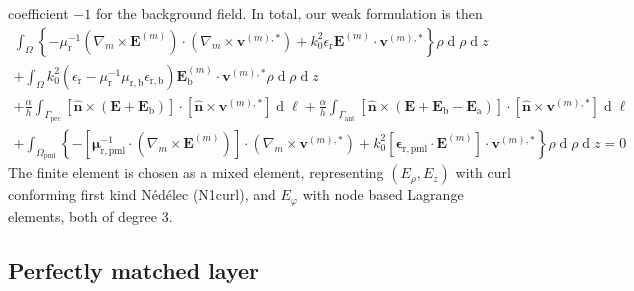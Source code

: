\documentclass[a4paper,12pt]{article}
\renewcommand{\vec}[1]{\boldsymbol{#1}}
\newcommand{\unitvec}[1]{\hat{\vec{#1}}}
\newcommand{\mrm}[1]{\mathrm{#1}}
\newcommand{\diff}{\operatorname{d}\!}
\newcommand{\Ev}{\vec{E}}
\newcommand{\nuv}{\unitvec{n}}
\newcommand{\vv}{\vec{v}}
\newcommand{\epsm}{\boldsymbol{\epsilon}}
\newcommand{\mum}{\boldsymbol{\mu}}
\begin{document}
coefficient $-1$ for the background field. In total, our weak
formulation is then
\begin{multline}
  \int_{\Omega} \left\{ - \mu_{\mrm{r}}^{-1}(\nabla_{m}\times\Ev^{(m)})\cdot(\nabla_{m}\times\vv^{(m),*}) + k_{0}^{2} \epsilon_{\mrm{r}}\Ev^{(m)}\cdot\vv^{(m),*} \right\} \rho\diff\rho\diff z \\
  + \int_{\Omega} k_{0}^{2} (\epsilon_{\mrm{r}}-\mu_{\mrm{r}}^{-1}\mu_{\mrm{r,b}}\epsilon_{\mrm{r,b}}) \Ev_{\mrm{b}}^{(m)}\cdot\vv^{(m),*} \rho\diff\rho\diff z \\
  + \frac{\alpha}{h}\int_{\Gamma_{\mrm{pec}}} [\nuv\times(\Ev + \Ev_{\mrm{b}})] \cdot [\nuv\times\vv^{(m),*}] \diff\ell 
  + \frac{\alpha}{h}\int_{\Gamma_{\mrm{ant}}} [\nuv\times(\Ev + \Ev_{\mrm{b}} - \Ev_{\mrm{a}})] \cdot [\nuv\times\vv^{(m),*}] \diff\ell \\
  + \int_{\Omega_{\mrm{pml}}} \left\{ -[\mum_{\mrm{r,pml}}^{-1}\cdot(\nabla_{m}\times\Ev^{(m)})]\cdot(\nabla_{m}\times\vv^{(m),*}) + k_{0}^{2}[\epsm_{\mrm{r,pml}}\cdot\Ev^{(m)}]\cdot\vv^{(m),*} \right\} \rho\diff\rho\diff z = 0
\end{multline}
The finite element is chosen as a mixed element, representing
$(E_{\rho},E_{z})$ with curl conforming first kind Nédélec (N1curl),
and $E_{\varphi}$ with node based Lagrange elements, both of degree 3.

\subsection{Perfectly matched layer}
\end{document}
